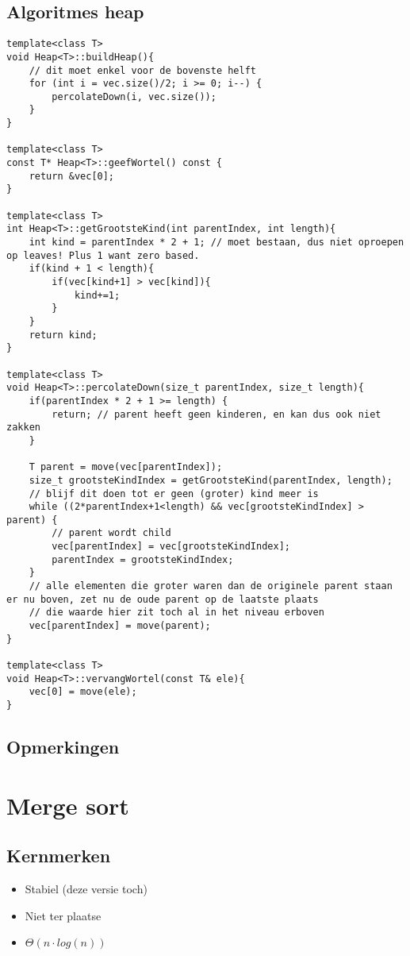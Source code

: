 \documentclass[a4paper]{article}
\begin{document}
\subsection*{Algoritmes heap}
\begin{lstlisting}
template<class T>
void Heap<T>::buildHeap(){
	// dit moet enkel voor de bovenste helft
	for (int i = vec.size()/2; i >= 0; i--) {
		percolateDown(i, vec.size());
	}
}

template<class T>
const T* Heap<T>::geefWortel() const {
	return &vec[0];
}

template<class T>
int Heap<T>::getGrootsteKind(int parentIndex, int length){
	int kind = parentIndex * 2 + 1; // moet bestaan, dus niet oproepen op leaves! Plus 1 want zero based.
	if(kind + 1 < length){
		if(vec[kind+1] > vec[kind]){
			kind+=1;
		}
	}
	return kind;
}

template<class T>
void Heap<T>::percolateDown(size_t parentIndex, size_t length){
	if(parentIndex * 2 + 1 >= length) {
		return; // parent heeft geen kinderen, en kan dus ook niet zakken
	}

	T parent = move(vec[parentIndex]);
	size_t grootsteKindIndex = getGrootsteKind(parentIndex, length);
	// blijf dit doen tot er geen (groter) kind meer is
	while ((2*parentIndex+1<length) && vec[grootsteKindIndex] > parent) {
		// parent wordt child
		vec[parentIndex] = vec[grootsteKindIndex];
		parentIndex = grootsteKindIndex;
	}
	// alle elementen die groter waren dan de originele parent staan er nu boven, zet nu de oude parent op de laatste plaats
	// die waarde hier zit toch al in het niveau erboven
	vec[parentIndex] = move(parent);
}

template<class T>
void Heap<T>::vervangWortel(const T& ele){
	vec[0] = move(ele);
}
\end{lstlisting}

\subsection*{Opmerkingen}
\newpage

\section{Merge sort}
\subsection*{Kernmerken}
\begin{itemize}
	\item Stabiel (deze versie toch)
	\item Niet ter plaatse
	\item $\Theta(n \cdot log(n))$
\end{itemize}
\end{document}
